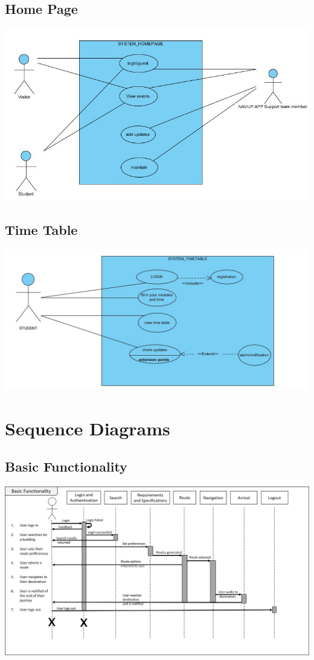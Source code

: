 \documentclass[12pt]{article}
\begin{document}
	\subsection{Home Page}
	\includegraphics[width=\linewidth]{Home page.jpg}
	
	\subsection{Time Table}
	\includegraphics[width=\linewidth]{timetable.jpg}
	
	
	
	
\section{Sequence Diagrams}
	
	\subsection{Basic Functionality}
	\includegraphics[width=\linewidth]{BasicFunctionality_SequenceDiagram_Schae.jpg}
	
	
\end{document}
